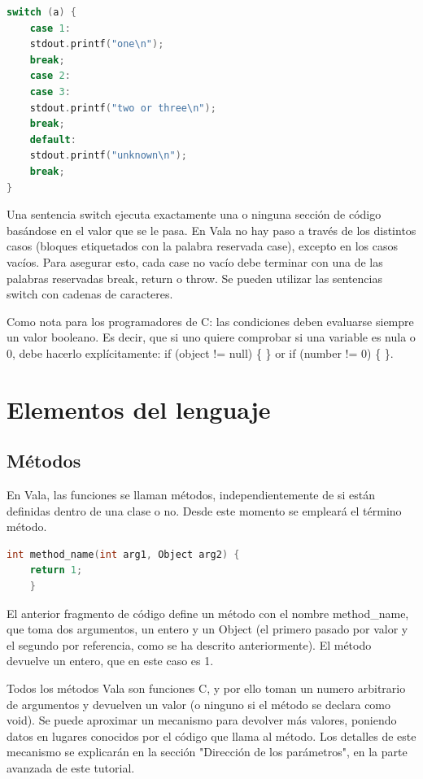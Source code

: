 \documentclass[12pt,twoside]{book}
\begin{document}
\begin{lstlisting}[language=C++]
switch (a) {
	case 1:
	stdout.printf("one\n");
	break;
	case 2:
	case 3:
	stdout.printf("two or three\n");
	break;
	default:
	stdout.printf("unknown\n");
	break;
}
\end{lstlisting}

Una sentencia switch ejecuta exactamente una o ninguna sección de código basándose en el valor que se le pasa. En Vala no hay paso a través de los distintos casos (bloques etiquetados con la palabra reservada case), excepto en los casos vacíos. Para asegurar esto, cada case no vacío debe terminar con una de las palabras reservadas break, return o throw. Se pueden utilizar las sentencias switch con cadenas de caracteres.

Como nota para los programadores de C: las condiciones deben evaluarse siempre un valor booleano. Es decir, que si uno quiere comprobar si una variable es nula o 0, debe hacerlo explícitamente: if (object != null) \{ \} or if (number != 0) \{ \}.

\section{Elementos del lenguaje}

\subsection{Métodos}

En Vala, las funciones se llaman métodos, independientemente de si están definidas dentro de una clase o no. Desde este momento se empleará el término método.

\begin{lstlisting}[language=C++]
int method_name(int arg1, Object arg2) {
	return 1;
	}
\end{lstlisting}

El anterior fragmento de código define un método con el nombre method\_name, que toma dos argumentos, un entero y un Object (el primero pasado por valor y el segundo por referencia, como se ha descrito anteriormente). El método devuelve un entero, que en este caso es 1.

Todos los métodos Vala son funciones C, y por ello toman un numero arbitrario de argumentos y devuelven un valor (o ninguno si el método se declara como void). Se puede aproximar un mecanismo para devolver más valores, poniendo datos en lugares conocidos por el código que llama al método. Los detalles de este mecanismo se explicarán en la sección "Dirección de los parámetros", en la parte avanzada de este tutorial.
\end{document}
